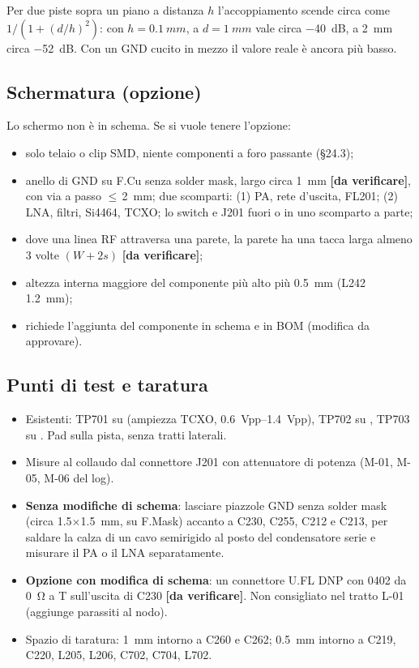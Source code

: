 \documentclass[a4paper,10pt]{article}
\newcommand{\net}[1]{\texttt{\detokenize{#1}}}
\newcommand{\dv}{\textcolor{verfr}{\textbf{[da verificare]}}}
\begin{document}
\begin{perche}
Per due piste sopra un piano a distanza $h$ l'accoppiamento scende circa come $1/(1+(d/h)^2)$: con
$h=\SI{0.1}{mm}$, a $d=\SI{1}{mm}$ vale circa \SI{-40}{dB}, a \SI{2}{mm} circa \SI{-52}{dB}. Con un GND
cucito in mezzo il valore reale è ancora più basso.
\end{perche}

\subsection{Schermatura (opzione)}
Lo schermo non è in schema. Se si vuole tenere l'opzione:
\begin{itemize}
\item solo telaio o clip SMD, niente componenti a foro passante (\S24.3);
\item anello di GND su F.Cu senza solder mask, largo circa \SI{1}{mm} \dv, con via a passo
      $\le$\,\SI{2}{mm}; due scomparti: (1) PA, rete d'uscita, FL201; (2) LNA, filtri, Si4464, TCXO;
      lo switch e J201 fuori o in uno scomparto a parte;
\item dove una linea RF attraversa una parete, la parete ha una tacca larga almeno 3 volte $(W+2s)$ \dv;
\item altezza interna maggiore del componente più alto più \SI{0.5}{mm} (L242 \SI{1.2}{mm});
\item richiede l'aggiunta del componente in schema e in BOM (modifica da approvare).
\end{itemize}

\subsection{Punti di test e taratura}
\begin{itemize}
\item Esistenti: TP701 su \net{RF_XIN} (ampiezza TCXO, \SIrange{0.6}{1.4}{Vpp}), TP702 su
      \net{EN_TX_ANT_SW}, TP703 su \net{EN_RX_LNA}. Pad sulla pista, senza tratti laterali.
\item Misure al collaudo dal connettore J201 con attenuatore di potenza (M-01, M-05, M-06 del log).
\item \textbf{Senza modifiche di schema}: lasciare piazzole GND senza solder mask (circa
      \SI{1.5}{}$\times$\SI{1.5}{mm}, su F.Mask) accanto a C230, C255, C212 e C213, per saldare la calza di un
      cavo semirigido al posto del condensatore serie e misurare il PA o il LNA separatamente.
\item \textbf{Opzione con modifica di schema}: un connettore U.FL DNP con 0402 da \SI{0}{\ohm} a T
      sull'uscita di C230 \dv. Non consigliato nel tratto L-01 (aggiunge parassiti al nodo).
\item Spazio di taratura: \SI{1}{mm} intorno a C260 e C262; \SI{0.5}{mm} intorno a C219, C220, L205, L206,
      C702, C704, L702.
\end{itemize}
\end{document}
